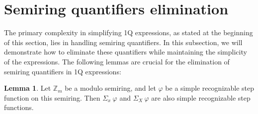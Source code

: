 \documentclass[en]{pracamgr}
\theoremstyle{definition}
\newtheorem{lemma}[theorem]{Lemma}
\begin{document}
\section{Semiring quantifiers elimination}
The primary complexity in simplifying 1Q expressions, as stated at the beginning of this section, lies in handling semiring quantifiers. In this subsection, we will demonstrate how to eliminate these quantifiers while maintaining the simplicity of the expressions. The following lemmas are crucial for the elimination of semiring quantifiers in 1Q expressions:

\begin{lemma}
    \label{QuantElimAdd}
    Let $\mathbb{Z}_m$ be a modulo semiring, and let $\varphi$ be a simple recognizable step function on this semiring. Then $\Sigma_x \ \varphi$ and $\Sigma_X \ \varphi$ are also simple recognizable step functions.
\end{lemma}
\end{document}
